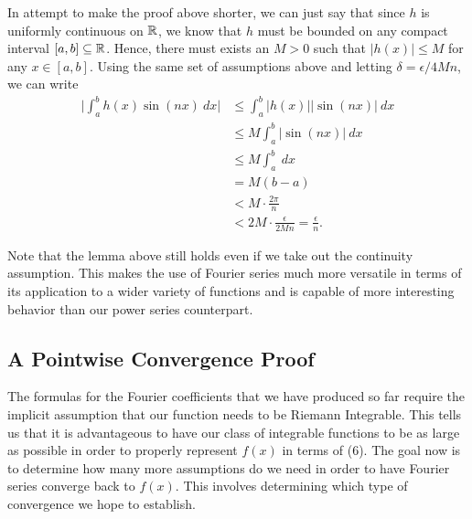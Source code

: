 In attempt to make the proof above shorter, we can just say that since \( h  \) is uniformly continuous on \( \mathbb{R}  \), we know that \( h  \) must be bounded on any compact interval \( [a,b] \subseteq \mathbb{R}  \). Hence, there must exists an \( M > 0 \) such that \( | h(x)  | \leq M  \) for any \(  x \in [a,b]  \). Using the same set of assumptions above and letting \( \delta = \epsilon  / 4 M n  \), we can write 
\begin{align*}
    \Big| \int_{ a }^{ b } h(x) \sin(nx)  \ dx \Big| &\leq \int_{ a }^{ b } | h(x)  | | \sin(nx) |  \ dx \\
                                                     &\leq M \int_{ a }^{ b } | \sin(nx)  |  \ dx \\
                                                     &\leq M \int_{ a }^{ b }  \ dx \\
                                                     &= M (b-a) \\
                                                     &< M \cdot \frac{ 2 \pi    }{ n } \\
                                                     &< 2M \cdot \frac{ \epsilon  }{ 2 M n } = \frac{ \epsilon  }{ n }. 
\end{align*}


Note that the lemma above still holds even if we take out the continuity assumption. This makes the use of Fourier series much more versatile in terms of its application to a wider variety of functions and is capable of more interesting behavior than our power series counterpart.


\subsection{A Pointwise Convergence Proof}

The formulas for the Fourier coefficients that we have produced so far require the implicit assumption that our function needs to be Riemann Integrable. This tells us that it is advantageous to have our class of integrable functions to be as large as possible in order to properly represent \( f(x)  \) in terms of (6). The goal now is to determine how many more assumptions do we need in order to have Fourier series converge back to \( f(x)  \). This involves determining which type of convergence we hope to establish.

